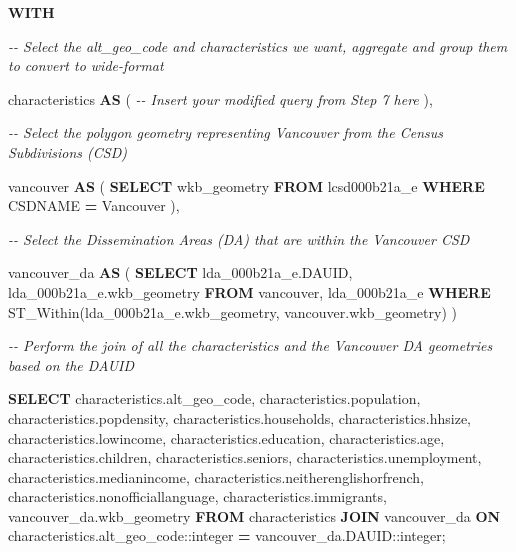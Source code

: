 \documentclass[
]{book}
\newenvironment{Shaded}{\begin{snugshade}}{\end{snugshade}}
\newcommand{\CharTok}[1]{\textcolor[rgb]{0.31,0.60,0.02}{#1}}
\newcommand{\CommentTok}[1]{\textcolor[rgb]{0.56,0.35,0.01}{\textit{#1}}}
\newcommand{\KeywordTok}[1]{\textcolor[rgb]{0.13,0.29,0.53}{\textbf{#1}}}
\newcommand{\NormalTok}[1]{#1}
\newcommand{\OperatorTok}[1]{\textcolor[rgb]{0.81,0.36,0.00}{\textbf{#1}}}
\newcommand{\StringTok}[1]{\textcolor[rgb]{0.31,0.60,0.02}{#1}}
\begin{document}
\begin{Shaded}
\begin{Highlighting}[]
\KeywordTok{WITH} 

\CommentTok{{-}{-} Select the alt\_geo\_code and characteristics we want, aggregate and group them to convert to wide{-}format}

\NormalTok{characteristics }\KeywordTok{AS}\NormalTok{ (}
  \CommentTok{{-}{-} Insert your modified query from Step 7 here}
\NormalTok{),}

\CommentTok{{-}{-} Select the polygon geometry representing Vancouver from the Census Subdivisions (CSD)}

\NormalTok{vancouver }\KeywordTok{AS}\NormalTok{ (}
  \KeywordTok{SELECT}\NormalTok{ wkb\_geometry }
  \KeywordTok{FROM}\NormalTok{ lcsd000b21a\_e }
  \KeywordTok{WHERE}\NormalTok{ CSDNAME }\OperatorTok{=} \StringTok{\textquotesingle{}Vancouver\textquotesingle{}}
\NormalTok{),}

\CommentTok{{-}{-} Select the Dissemination Areas (DA) that are within the Vancouver CSD}

\NormalTok{vancouver\_da }\KeywordTok{AS}\NormalTok{ (}
  \KeywordTok{SELECT}\NormalTok{ lda\_000b21a\_e.DAUID, lda\_000b21a\_e.wkb\_geometry}
  \KeywordTok{FROM}\NormalTok{ vancouver, lda\_000b21a\_e}
  \KeywordTok{WHERE}\NormalTok{ ST\_Within(lda\_000b21a\_e.wkb\_geometry, vancouver.wkb\_geometry)}
\NormalTok{)}

\CommentTok{{-}{-} Perform the join of all the characteristics and the Vancouver DA geometries based on the DAUID}

\KeywordTok{SELECT}
\NormalTok{  characteristics.alt\_geo\_code,}
\NormalTok{  characteristics.population,}
\NormalTok{  characteristics.popdensity,}
\NormalTok{  characteristics.households,}
\NormalTok{  characteristics.hhsize,}
\NormalTok{  characteristics.lowincome,}
\NormalTok{  characteristics.education,}
\NormalTok{  characteristics.age,}
\NormalTok{  characteristics.children,}
\NormalTok{  characteristics.seniors,}
\NormalTok{  characteristics.unemployment,}
\NormalTok{  characteristics.medianincome,}
\NormalTok{  characteristics.neitherenglishorfrench,}
\NormalTok{  characteristics.nonofficiallanguage,}
\NormalTok{  characteristics.immigrants,}
\NormalTok{  vancouver\_da.wkb\_geometry}
\KeywordTok{FROM}
\NormalTok{  characteristics}
\KeywordTok{JOIN}
\NormalTok{  vancouver\_da }\KeywordTok{ON}\NormalTok{ characteristics.alt\_geo\_code:}\CharTok{:integer} \OperatorTok{=}\NormalTok{ vancouver\_da.DAUID:}\CharTok{:integer}\NormalTok{;}
\end{Highlighting}
\end{Shaded}
\end{document}

